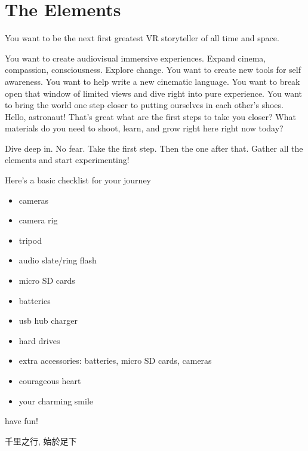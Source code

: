 \chapter{The Elements}
\pagecolor{white}
\label{chap:1}
\begin{fullwidth}


\problem

{\large You want to be the next first greatest VR storyteller of all time and space. \par}

You want to create audiovisual immersive experiences. Expand cinema, compassion, consciousness. Explore change. You want to create new tools for self awareness. You want to help write a new cinematic language. You want to break open that window of limited views and dive right into pure experience. You want to bring the world one step closer to putting ourselves in each other’s shoes. Hello, astronaut! That’s great what are the first steps to take you closer? What materials do you need to shoot, learn, and grow right here right now today?

\solution

{\large Dive deep in. No fear. Take the first step. Then the one after that. Gather all the elements and start experimenting! \par}

Here’s a basic checklist for your journey

\begin{itemize}
\item cameras
\item camera rig
\item tripod
\item audio slate/ring flash
\item micro SD cards
\item batteries
\item usb hub charger
\item hard drives
\item extra accessories: batteries, micro SD cards, cameras
\item courageous heart
\item your charming smile
\end{itemize}
                
have fun!

\begin{CJK*}{UTF8}{gbsn}
千里之行, 始於足下
\clearpage\end{CJK*}

\clearpage
\end{fullwidth}